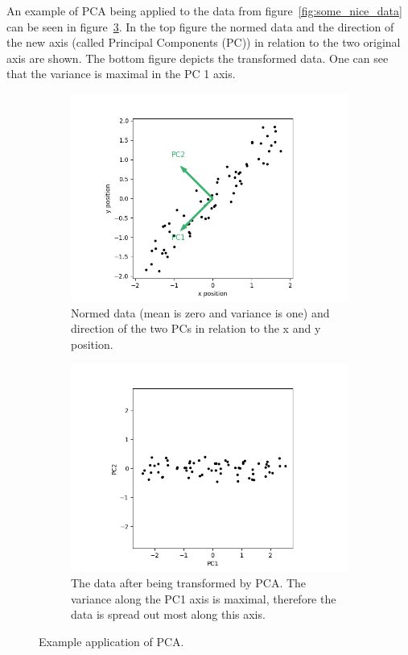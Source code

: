 An example of PCA being applied to the data from figure~\ref{fig:some_nice_data} can be seen in figure~\ref{fig:pca_example}. In the top figure the normed data and the direction of the new axis (called Principal Components (PC)) in relation to the two original axis are shown. The bottom figure depicts the transformed data. One can see that the variance is maximal in the PC 1 axis.

\begin{figure}
	\centering
	\begin{subfigure}{0.8\linewidth}
		\includegraphics[width=\textwidth]{figs/some_nice_data_pc}
		\caption{Normed data (mean is zero and variance is one) and direction of the two PCs in relation to the x and y position.}
		\label{fig:some_nice_data_pc}
	\end{subfigure}
	\hfill
	\begin{subfigure}{0.8\linewidth}
		\includegraphics[width=\textwidth]{figs/some_nice_data_pca}
		\caption{The data after being transformed by PCA. The variance along the PC1 axis is maximal, therefore the data is spread out most along this axis.}
		\label{fig:some_nice_data_pca}
	\end{subfigure}
	
	\caption{Example application of PCA.}
	\label{fig:pca_example}
\end{figure}

